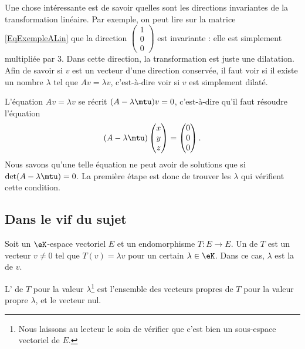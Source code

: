 Une chose intéressante est de savoir quelles sont les directions invariantes de la transformation linéaire. Par exemple, on peut lire sur la matrice \eqref{EqExempleALin} que la direction $\begin{pmatrix}
	1	\\
	0	\\
	0
\end{pmatrix}$ est invariante : elle est simplement multipliée par $3$. Dans cette direction, la transformation est juste une dilatation. Afin de savoir si $v$ est un vecteur d'une direction conservée, il faut voir si il existe un nombre $\lambda$ tel que $Av=\lambda v$, c'est-à-dire voir si $v$ est simplement dilaté.

L'équation $Av=\lambda v$ se récrit $(A-\lambda\mtu)v=0$, c'est-à-dire qu'il faut résoudre l'équation
\begin{equation}
	(A-\lambda\mtu)\begin{pmatrix}
		x	\\
		y	\\
		z
	\end{pmatrix}=
	\begin{pmatrix}
		0	\\
		0	\\
		0
	\end{pmatrix}.
\end{equation}
Nous savons qu'une telle équation ne peut avoir de solutions que si $\det(A-\lambda\mtu)=0$. La première étape est donc de trouver les $\lambda$ qui vérifient cette condition.

\subsection{Dans le vif du sujet}

\begin{definition}      \label{DefooMMKZooVcskCc}
    Soit un \( \eK\)-espace vectoriel \( E\) et un endomorphisme \( T\colon E\to E\). Un  de \( T\) est un vecteur \( v \neq 0\) tel que \( T(v)=\lambda v\) pour un certain \( \lambda\in \eK\). Dans ce cas, \( \lambda\) est la  de \( v\).

    L' de \( T\) pour la valeur \( \lambda\)\footnote{Nous laissons au lecteur le soin de vérifier que c'est bien un sous-espace vectoriel de \( E\).} est l'ensemble des vecteurs propres de \( T\) pour la valeur propre \( \lambda\), et le vecteur nul.
\end{definition}

